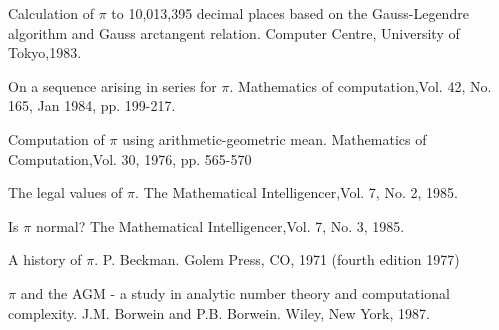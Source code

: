     {Calculation of $\pi$ to 10,013,395 decimal places based on the
    Gauss-Legendre algorithm and Gauss arctangent relation.}
    {Computer Centre, University of Tokyo,}{1983.}

    {On a sequence arising in series for $\pi$.}
    {Mathematics of computation,}{Vol. 42, No. 165, Jan 1984,
    pp. 199-217.}

    {Computation of $\pi$ using arithmetic-geometric mean.}
    {Mathematics of Computation,}{Vol. 30, 1976, pp. 565-570}

    {The legal values of $\pi$.}
    {The Mathematical Intelligencer,}{Vol. 7, No. 2, 1985.}

    {Is $\pi$ normal?}
    {The Mathematical Intelligencer,}{Vol. 7, No. 3, 1985.}

\medskip

    \book
    {A history of $\pi$.}
    {P. Beckman.}
    {Golem Press, CO, 1971 (fourth edition 1977)}


    \book
    {$\pi$ and the AGM - a study in analytic number theory and
    computational complexity.}
    {J.M. Borwein and P.B. Borwein.}
    {Wiley, New York, 1987.}
